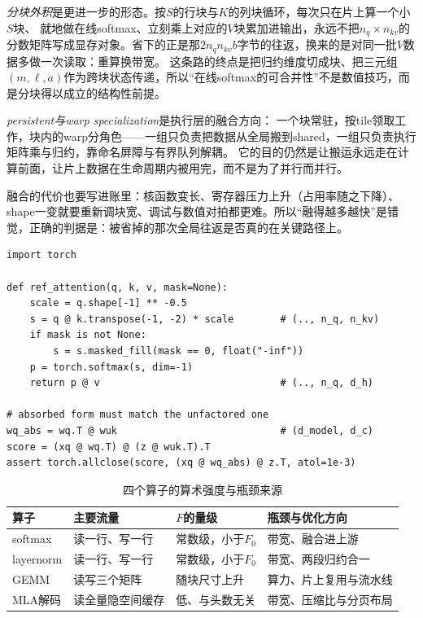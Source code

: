 \documentclass[12pt,a4paper,fontset=fandol]{ctexbook}
\begin{document}
\emph{分块外积}是更进一步的形态。按$S$的行块与$K$的列块循环，每次只在片上算一个小$S$块、
就地做在线softmax、立刻乘上对应的$V$块累加进输出，永远不把$n_q\times n_{kv}$的分数矩阵写成显存对象。省下的正是那$2n_qn_{kv}b$字节的往返，换来的是对同一批$V$数据多做一次读取：重算换带宽。
这条路的终点是把归约维度切成块、把三元组$(m,\ell,a)$作为跨块状态传递，所以``在线softmax的可合并性''不是数值技巧，而是分块得以成立的结构性前提。

\emph{persistent与warp specialization}是执行层的融合方向：
一个块常驻，按tile领取工作，块内的warp分角色——一组只负责把数据从全局搬到shared，一组只负责执行矩阵乘与归约，靠命名屏障与有界队列解耦。
它的目的仍然是让搬运永远走在计算前面，让片上数据在生命周期内被用完，而不是为了并行而并行。

融合的代价也要写进账里：核函数变长、寄存器压力上升（占用率随之下降）、shape一变就要重新调块宽、调试与数值对拍都更难。所以``融得越多越快''是错觉，正确的判据是：被省掉的那次全局往返是否真的在关键路径上。

\begin{lstlisting}[style=pythonstyle,caption={参考实现：注意力与吸收形式的代数等价（用于对拍）}]
import torch

def ref_attention(q, k, v, mask=None):
    scale = q.shape[-1] ** -0.5
    s = q @ k.transpose(-1, -2) * scale        # (.., n_q, n_kv)
    if mask is not None:
        s = s.masked_fill(mask == 0, float("-inf"))
    p = torch.softmax(s, dim=-1)
    return p @ v                               # (.., n_q, d_h)

# absorbed form must match the unfactored one
wq_abs = wq.T @ wuk                            # (d_model, d_c)
score = (xq @ wq.T) @ (z @ wuk.T).T
assert torch.allclose(score, (xq @ wq_abs) @ z.T, atol=1e-3)
\end{lstlisting}

\begin{table}[H]
\centering
\caption{四个算子的算术强度与瓶颈来源}
\begin{tabular}{@{}>{\raggedright\arraybackslash}p{}
  >{\raggedright\arraybackslash}p{}
  >{\raggedright\arraybackslash}p{}
  >{\raggedright\arraybackslash}p{}@{}}
\toprule
算子&主要流量& $F$的量级&瓶颈与优化方向\\
\midrule
softmax &读一行、写一行&常数级，小于$F_0$ &带宽、融合进上游\\
layernorm &读一行、写一行&常数级，小于$F_0$ &带宽、两段归约合一\\
GEMM &读写三个矩阵&随块尺寸上升&算力、片上复用与流水线\\
MLA解码&读全量隐空间缓存&低、与头数无关&带宽、压缩比与分页布局\\
\bottomrule
\end{tabular}
\end{table}
\end{document}
